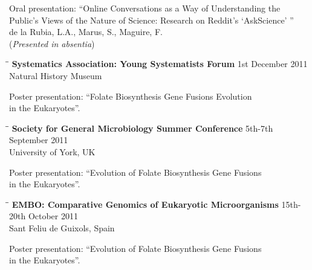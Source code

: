\documentclass{res}
\begin{document}
\begin{resume}
  \vspace{-30pt}     
Oral presentation: ``Online Conversations as a Way of Understanding the \\Public's Views of the Nature of Science: Research on Reddit's `AskScience' '' 
 \\ de la Rubia, L.A., Marus, S., Maguire, F. \\
 (\emph{Presented in absentia})
  \vspace{-0.1in}
  
  \begin{tabbing}
   \hspace{2in}\= \hspace{2.6in}\= \kill 
    {\bf Systematics Association: Young Systematists Forum} \>  \> 1st December 2011\\
                        \>     \> Natural History Museum
   \end{tabbing}\vspace{-20pt}      
   
   Poster presentation: ``Folate Biosynthesis Gene Fusions Evolution \\in the Eukaryotes''.
    \vspace{-0.1in}  
    \begin{tabbing}
   \hspace{2in}\= \hspace{2.6in}\= \kill 
    {\bf Society for General Microbiology Summer Conference} \> \>5th-7th September 2011\\
                          \>   \> University of York, UK

   \end{tabbing}\vspace{-20pt}      
      Poster presentation: ``Evolution of Folate Biosynthesis Gene Fusions \\in the Eukaryotes''.
      
  
  \vspace{-0.1in}
     \begin{tabbing} 
   \hspace{2in}\= \hspace{2.6in}\= \kill 
    {\bf EMBO: Comparative Genomics of Eukaryotic Microorganisms}
    \>  \> 15th-20th October 2011\\
                         \>    \> Sant Feliu de Guixols, Spain
   \end{tabbing}\vspace{-20pt}      
      Poster presentation: ``Evolution of Folate Biosynthesis Gene Fusions \\in the Eukaryotes''.
 

\end{resume}
\end{document}

